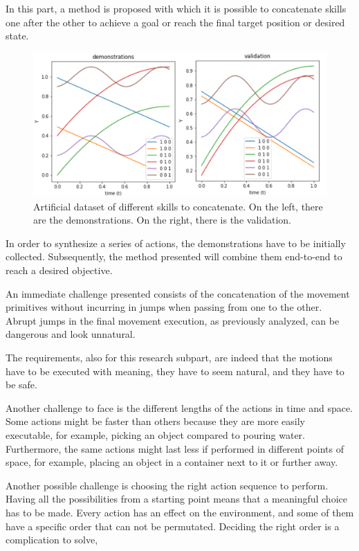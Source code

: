 In this part, a method is proposed with which it is possible to concatenate skills one after the other to achieve a goal or reach the final target position or desired state.

\begin{figure}
    \centering
    \includegraphics[width=0.9\linewidth]{figures/diff-traj-dataset.png}
    \caption{ Artificial dataset of different skills to concatenate. On the left, there are the demonstrations. On the right, there is the validation. }
    \label{fig:diff-traj-dataset}
\end{figure}

In order to synthesize a series of actions, the demonstrations have to be initially collected. 
Subsequently, the method presented will combine them end-to-end to reach a desired objective.

An immediate challenge presented consists of the concatenation of the movement primitives without incurring in jumps when passing from one to the other. Abrupt jumps in the final movement execution, as previously analyzed, can be dangerous and look unnatural. 

The requirements, also for this research subpart, are indeed that the motions have to be executed with meaning, they have to seem natural, and they have to be safe.  

Another challenge to face is the different lengths of the actions in time and space. Some actions might be faster than others because they are more easily executable, for example, picking an object compared to pouring water. Furthermore, the same actions might last less if performed in different points of space, for example, placing an object in a container next to it or further away. 

Another possible challenge is choosing the right action sequence to perform. Having all the possibilities from a starting point means that a meaningful choice has to be made. Every action has an effect on the environment, and some of them have a specific order that can not be permutated. Deciding the right order is a complication to solve, 

